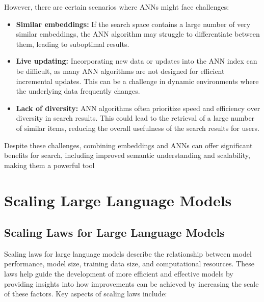 \documentclass[12pt]{article}
\begin{document}
However, there are certain scenarios where ANNs might face challenges:

\begin{itemize}
\item \textbf{Similar embeddings:} If the search space contains a large number of very similar embeddings, the ANN algorithm may struggle to differentiate between them, leading to suboptimal results.
\item \textbf{Live updating:} Incorporating new data or updates into the ANN index can be difficult, as many ANN algorithms are not designed for efficient incremental updates. This can be a challenge in dynamic environments where the underlying data frequently changes.
\item \textbf{Lack of diversity:} ANN algorithms often prioritize speed and efficiency over diversity in search results. This could lead to the retrieval of a large number of similar items, reducing the overall usefulness of the search results for users.
\end{itemize}
Despite these challenges, combining embeddings and ANNs can offer significant benefits for search, including improved semantic understanding and scalability, making them a powerful tool
\section{Scaling Large Language Models}

\subsection{Scaling Laws for Large Language Models}
Scaling laws for large language models describe the relationship between model performance, model size, training data size, and computational resources. These laws help guide the development of more efficient and effective models by providing insights into how improvements can be achieved by increasing the scale of these factors. Key aspects of scaling laws include:
\end{document}
